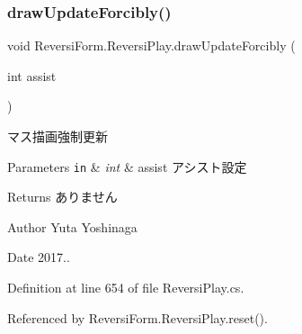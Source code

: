 \subsubsection{\texorpdfstring{draw\+Update\+Forcibly()}{drawUpdateForcibly()}}
{\footnotesize\ttfamily void Reversi\+Form.\+Reversi\+Play.\+draw\+Update\+Forcibly (\begin{DoxyParamCaption}\item[{int}]{assist }\end{DoxyParamCaption})}



マス描画強制更新 


\begin{DoxyParams}[1]{Parameters}
\mbox{\tt in}  & {\em int} & assist アシスト設定 \\
\hline
\end{DoxyParams}
\begin{DoxyReturn}{Returns}
ありません 
\end{DoxyReturn}
\begin{DoxyAuthor}{Author}
Yuta Yoshinaga 
\end{DoxyAuthor}
\begin{DoxyDate}{Date}
2017.. 
\end{DoxyDate}


Definition at line 654 of file Reversi\+Play.\+cs.



Referenced by Reversi\+Form.\+Reversi\+Play.\+reset().


